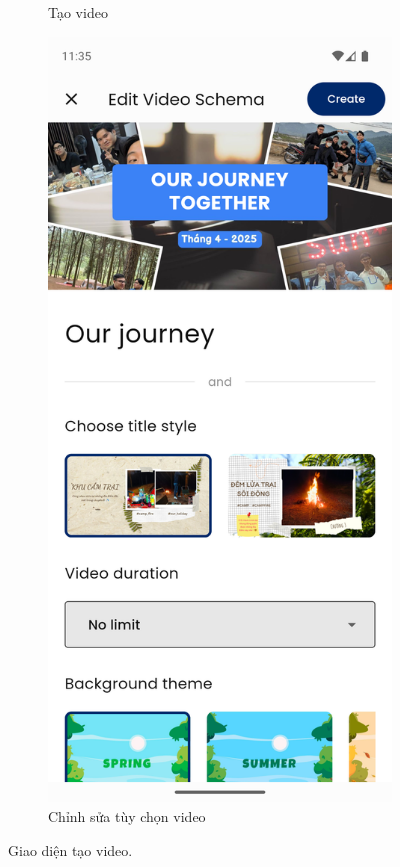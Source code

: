 \begin{figure}[H]
\begin{subfigure}{0.48\textwidth}
        \caption{Tạo video}
    \end{subfigure}
    \hfill
    \begin{subfigure}{0.48\textwidth}
        \includegraphics[width=1\linewidth]{figures/c4/4-2/create_video_2.png} 
        \caption{Chỉnh sửa tùy chọn video}
    \end{subfigure}
    \caption{Giao diện tạo video.}
    \label{fig:video_create}
\end{figure}